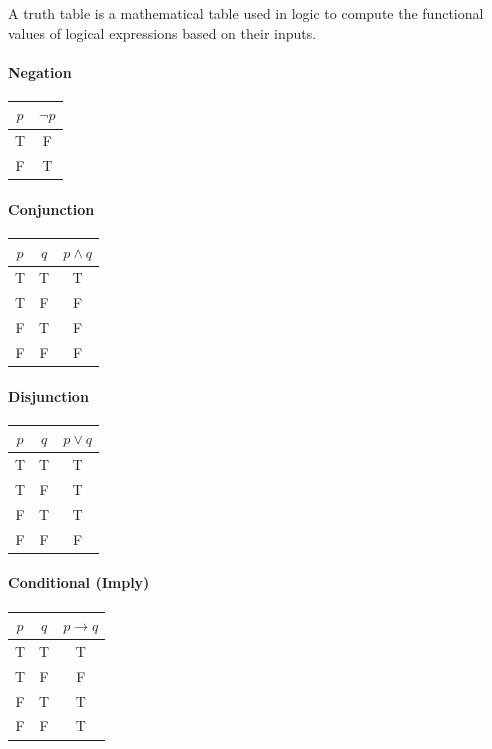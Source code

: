 \begin{definition}
A truth table is a mathematical table used in logic to compute the functional values of logical expressions based on their inputs.
\end{definition}

\paragraph{Negation}
\begin{center}
\begin{tabular}{c|c}
\toprule
$p$ & $\neg p$ \\
\midrule
T & F \\
F & T \\
\bottomrule
\end{tabular}
\end{center}

\paragraph{Conjunction}
\begin{center}
\begin{tabular}{cc|c}
\toprule
$p$ & $q$ & $p \wedge q$ \\
\midrule
T & T & T \\
T & F & F \\
F & T & F \\
F & F & F \\
\bottomrule
\end{tabular}
\end{center}

\newpage

\paragraph{Disjunction}
\begin{center}
\begin{tabular}{cc|c}
\toprule
$p$ & $q$ & $p \vee q$ \\
\midrule
T & T & T \\
T & F & T \\
F & T & T \\
F & F & F \\
\bottomrule
\end{tabular}
\end{center}

\paragraph{Conditional (Imply)}
\begin{center}
\begin{tabular}{cc|c}
\toprule
$p$ & $q$ & $p \to q$ \\
\midrule
T & T & T \\
T & F & F \\
F & T & T \\
F & F & T \\
\bottomrule
\end{tabular}
\end{center}

